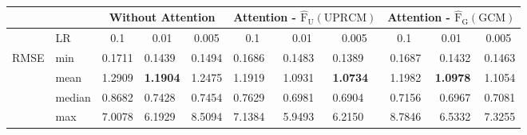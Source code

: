 \begin{table}[tbp]
    \centering
    \caption{}
    \renewcommand\arraystretch{1.5}
\begin{tabular}{clllllllrrr}
\multicolumn{1}{l}{}         &                             & \multicolumn{3}{c}{Without Attention}                                                                 & \multicolumn{3}{c}{Attention - $\mathrm{\hat{F}_{U}(UPRCM)}$}                                                       & \multicolumn{3}{c}{Attention - $\mathrm{\hat{F}_{G}(GCM)}$}                                                        \\ \hline
\multicolumn{1}{l}{}         & \multicolumn{1}{l|}{LR}     & \multicolumn{1}{c}{0.1}      & \multicolumn{1}{c}{0.01}      & \multicolumn{1}{c|}{0.005}             & \multicolumn{1}{c}{0.1} & \multicolumn{1}{c}{0.01} & \multicolumn{1}{c|}{0.005}             & \multicolumn{1}{c}{0.1}      & \multicolumn{1}{c}{0.01}     & \multicolumn{1}{c}{0.005}    \\ \hline
\multirow{4}{*}{RMSE}        & \multicolumn{1}{l|}{min}    & 0.1711                     & 0.1439                      & \multicolumn{1}{l|}{0.1494}          & 0.1686                & 0.1483                 & \multicolumn{1}{l|}{0.1389}          & 0.1687                     & 0.1432                     & 0.1463                     \\
                             & \multicolumn{1}{l|}{mean}   & 1.2909                     & \textbf{1.1904}             & \multicolumn{1}{l|}{1.2475}          & 1.1919                & 1.0931                 & \multicolumn{1}{l|}{\textbf{1.0734}} & 1.1982                     & \textbf{1.0978}            & 1.1054                     \\
                             & \multicolumn{1}{l|}{median} & 0.8682                     & 0.7428                      & \multicolumn{1}{l|}{0.7454}          & 0.7629                & 0.6981                 & \multicolumn{1}{l|}{0.6904}          & 0.7156                     & 0.6967                     & 0.7081                     \\
                             & \multicolumn{1}{l|}{max}    & 7.0078                     & 6.1929                     & \multicolumn{1}{l|}{8.5094}          & 7.1384                & 5.9493                 & \multicolumn{1}{l|}{6.2150}          & 8.7846                     & 6.5332                     & 7.3255                     \\ \hline

\end{tabular}
\end{table}
